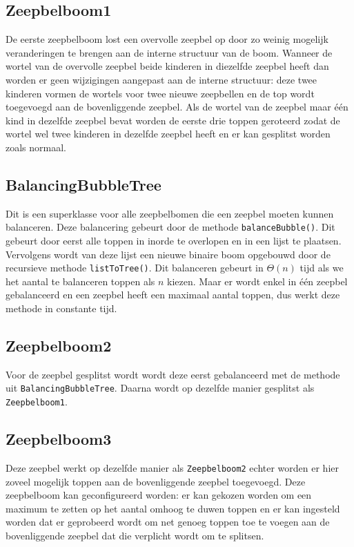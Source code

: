 \documentclass[12pt,hidelinks]{article}
\begin{document}
    \subsection{Zeepbelboom1}
    De eerste zeepbelboom  lost een overvolle zeepbel op door zo weinig mogelijk
    veranderingen te brengen aan de interne structuur van de boom. Wanneer de wortel van
    de overvolle zeepbel beide kinderen in diezelfde zeepbel heeft dan worden er geen
    wijzigingen aangepast aan de interne structuur: deze twee kinderen vormen de wortels
    voor twee nieuwe zeepbellen en de top wordt toegevoegd aan de bovenliggende zeepbel.
    Als de wortel van de zeepbel maar één kind in dezelfde zeepbel bevat worden de
    eerste drie toppen geroteerd zodat de wortel wel twee kinderen in dezelfde zeepbel
    heeft en er kan gesplitst worden zoals normaal.
    \subsection{BalancingBubbleTree}
    Dit is een superklasse voor alle zeepbelbomen die een zeepbel moeten kunnen balanceren.
    Deze balancering gebeurt door de methode {\tt balanceBubble()}. Dit gebeurt door eerst 
    alle toppen in inorde te overlopen en in een lijst te plaatsen.
    Vervolgens wordt van deze lijst een nieuwe binaire boom opgebouwd door de recursieve
    methode {\tt listToTree()}. Dit balanceren gebeurt in $\Theta (n)$ tijd als we het
    aantal te balanceren toppen als $n$ kiezen. Maar er wordt enkel in één zeepbel
    gebalanceerd en een zeepbel heeft een maximaal aantal toppen, dus werkt deze methode
    in constante tijd.   
    \subsection{Zeepbelboom2}
    Voor de zeepbel gesplitst wordt wordt deze eerst gebalanceerd met de methode
    uit {\tt BalancingBubbleTree}. Daarna wordt op dezelfde manier gesplitst als
    {\tt Zeepbelboom1}.
    \subsection{Zeepbelboom3}
    Deze zeepbel werkt op dezelfde manier als {\tt Zeepbelboom2} echter worden er hier
    zoveel mogelijk toppen aan de bovenliggende zeepbel toegevoegd. Deze zeepbelboom
    kan geconfigureerd worden: er kan gekozen worden om een maximum te zetten op het 
    aantal omhoog te duwen toppen en er kan ingesteld worden dat er geprobeerd wordt
    om net genoeg toppen toe te voegen aan de bovenliggende zeepbel dat die verplicht
    wordt om te splitsen.  
\end{document}
